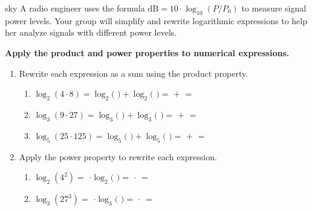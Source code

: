 \documentclass[10pt]{article}
\begin{document}
\namepartnerperiod

\vspace{0.1in}

\begin{scenariobox}{sky}
A radio engineer uses the formula $\text{dB} = 10 \cdot \log_{10}(P/P_0)$ to measure signal
power levels. Your group will simplify and rewrite logarithmic expressions to help her
analyze signals with different power levels.
\end{scenariobox}

\vspace{0.1in}

\begin{tcolorbox}[colback=white, colframe=black!40,
    title=\textbf{Tier R --- Remediate},
    fonttitle=\bfseries, arc=2mm, left=3mm, right=3mm, top=2mm, bottom=2mm]

\textbf{Apply the product and power properties to numerical expressions.}

\begin{enumerate}[leftmargin=1.8em, itemsep=10pt]

\item Rewrite each expression as a sum using the product property.

\vspace{4pt}
\begin{enumerate}[leftmargin=1.5em, itemsep=8pt, label=\alph*.]
  \item $\log_2(4 \cdot 8) = \log_2($  $) + \log_2($  $) = $  $+$  $=$ 
  \item $\log_3(9 \cdot 27) = \log_3($  $) + \log_3($  $) = $  $+$  $=$ 
  \item $\log_5(25 \cdot 125) = \log_5($  $) + \log_5($  $) = $  $+$  $=$ 
\end{enumerate}

\vspace{4pt}
\item Apply the power property to rewrite each expression.

\vspace{4pt}
\begin{enumerate}[leftmargin=1.5em, itemsep=8pt, label=\alph*.]
  \item $\log_2(4^2) = $  $\cdot \log_2($  $) = $  $\cdot$  $=$ 
  \item $\log_3(27^3) = $  $\cdot \log_3($  $) = $  $\cdot$  $=$ 
\end{enumerate}

\end{enumerate}
\end{tcolorbox}
\end{document}
